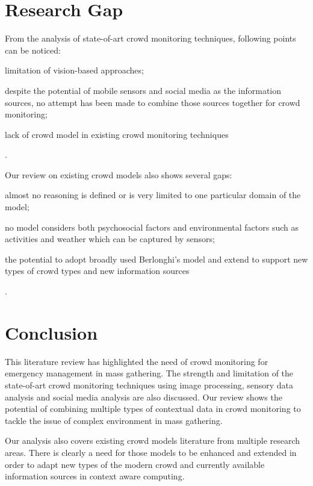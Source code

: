 \section{Research Gap}
From the analysis of state-of-art crowd monitoring techniques, following points can be noticed:
\begin{inparaenum}[i)]
	\item limitation of vision-based approaches;
	\item despite the potential of mobile sensors and social media as the information sources, no attempt has been made to combine those sources together for crowd monitoring;
	\item lack of crowd model in existing crowd monitoring techniques
\end{inparaenum}.

Our review on existing crowd models also shows several gaps:
\begin{inparaenum}[i)]
	\item almost no reasoning is defined or is very limited to one particular domain of the model;
	\item no model considers both psychosocial factors and environmental factors such as activities and weather which can be captured by sensors;
	\item the potential to adopt broadly used Berlonghi’s model and extend to support new types of crowd types and new information sources
\end{inparaenum}.

\section{Conclusion}
This literature review has highlighted the need of crowd monitoring for emergency management in mass gathering. The strength and limitation of the state-of-art crowd monitoring techniques using image processing, sensory data analysis and social media analysis are also discussed. Our review shows the potential of combining multiple types of contextual data in crowd monitoring to tackle the issue of complex environment in mass gathering.

Our analysis also covers existing crowd models literature from multiple research areas. There is clearly a need for those models to be enhanced and extended in order to adapt new types of the modern crowd and currently available information sources in context aware computing.